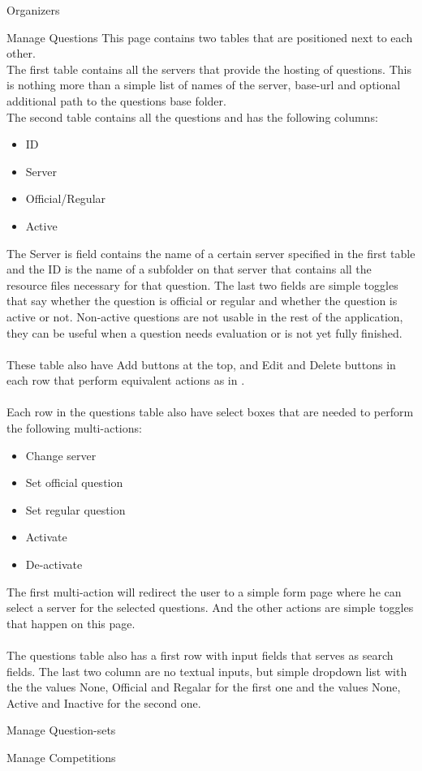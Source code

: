 \documentclass[]{article}
\begin{document}
\begin{section}{Organizers}
	\begin{subsection}{Manage Questions}
		This page contains two tables that are positioned next to each other. \\
		The first table contains all the servers that provide the hosting of questions.
		This is nothing more than a simple list of names of the server, base-url and
		optional additional path to the questions base folder. \\
		The second table contains all the questions and has the following columns:
		\begin{itemize}
			\item ID
			\item Server
			\item Official/Regular
			\item Active
		\end{itemize}
		The Server is field contains the name of a certain server specified in the first
		table and the ID is the name of a subfolder on that server that contains all the
		resource files necessary for that question.
		The last two fields are simple toggles that say whether the question is official
		or regular and whether the question is active or not. Non-active questions are
		not usable in the rest of the application, they can be useful when a question
		needs evaluation or is not yet fully finished. \\
		\\
		These table also have Add buttons at the top, and Edit and Delete buttons in each
		row that perform equivalent actions as in .
		\\
		\\
		Each row in the questions table also have select boxes that are needed to perform
		the following multi-actions:
		\begin{itemize}
			\item Change server
			\item Set official question
			\item Set regular question
			\item Activate
			\item De-activate
		\end{itemize}
		The first multi-action will redirect the user to a simple form page where he can
		select a server for the selected questions. And the other actions are simple
		toggles that happen on this page.\\
		\\
		The questions table also has a first row with input fields that serves as
		search fields. The last two column are no textual inputs, but simple dropdown
		list with the the values None, Official and Regalar for the first one and the
		values None, Active and Inactive for the second one.
	\end{subsection}
	
	\begin{subsection}{Manage Question-sets}
		
	\end{subsection}
	
	\begin{subsection}{Manage Competitions}
		
	\end{subsection}
\end{section}
\end{document}
